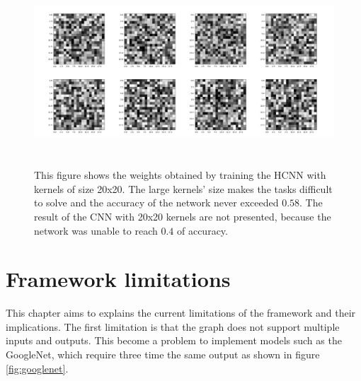 \documentclass[11pt]{report}
\begin{document}
\begin{figure}[h]
\centering
\includegraphics[width=16cm, height=7cm]{trained_weights_20}
\caption[Illustration of the HCNN's weights after training (20x20 kernels).]{This figure shows the weights obtained by training the HCNN with kernels of size 20x20. The large kernels' size makes the tasks difficult to solve and the accuracy of the network never exceeded $0.58$. The result of the CNN with 20x20 kernels are not presented, because the network was unable to reach $0.4$ of accuracy.}
\label{fig:trained_weights_20}
\end{figure}

\chapter{Framework limitations} \label{framework_limitation}

This chapter aims to explains the current limitations of the framework and their implications. The first limitation is that the graph does not support multiple inputs and outputs. This become a problem to implement models such as the GoogleNet, which require three time the same output as shown in figure \ref{fig:googlenet}.
\end{document}
